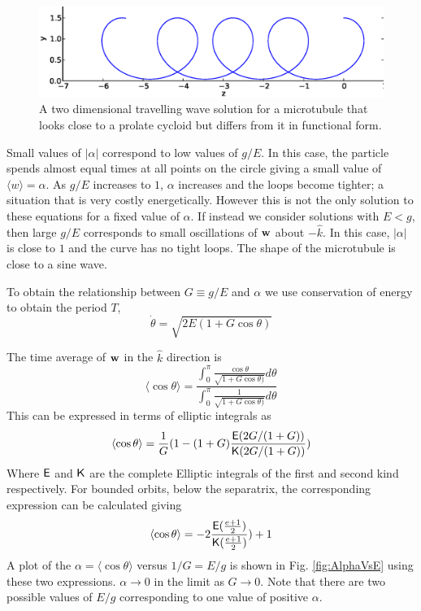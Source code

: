 \documentclass[11pt]{ucthesis}
\def\bw{{\bf w}}
\begin{document}
\begin{figure}[htp]
\begin{center}
\includegraphics[width=\hsize]{shape1.eps}
\caption{ 
A two dimensional travelling wave solution for a microtubule that looks close to a prolate cycloid but
differs from it in functional form.
}
\label{fig:prolate}
\end{center}
\end{figure}

Small values of $|\alpha|$ correspond to low values of $g/E$. In this case, the particle spends almost
equal times at all points on the circle giving a small value of $\langle w\rangle = \alpha$. As $g/E$
increases to $1$, $\alpha$ increases and the loops become tighter; a situation that is very costly energetically.
However this is not the only solution to these equations for a fixed value of $\alpha$. If instead we
consider solutions with $E < g$, then large $g/E$ corresponds to small oscillations of $\bw$ about $-{\hat k}$.
In this case, $|\alpha|$ is close to $1$ and the curve has no tight loops. The shape of the microtubule
is close to a sine wave.

To obtain the relationship between $G \equiv g/E$ and $\alpha$ we use conservation of energy
to obtain the period $T$,
\begin{equation}
\label{eq:pendulumenergy}
\dot{\theta} = \sqrt{2E(1+G\cos\theta)}
\end{equation}

The time average of $\bw$ in the $\hat k$ direction is
\begin{equation}
\label{eq:avependulumcostheta}
\langle \cos\theta\rangle = \frac{\int_0^\pi \frac{\cos\theta}{\sqrt{1+G\cos\theta)}} d\theta}{\int_0^\pi \frac{1}{\sqrt{1+G\cos\theta)}} d\theta}
\end{equation}
This can be expressed in terms of elliptic integrals as
\begin{equation}
\label{eq:avecosthetaElliptic}
\langle \cos\theta\rangle =  \frac{1}{G} (1- (1+G) \frac{{\sf E}(2G/(1+G))}{{\sf K}(2G/(1+G))})
\end{equation}
Where  $\sf E$ and $\sf K$ are the complete Elliptic integrals of the first and second kind respectively.
For bounded orbits, below the separatrix, the corresponding expression can be calculated giving
\begin{equation}
\label{eq:avecosthetaEllipticBounded}
\langle \cos\theta\rangle =  -2 \frac{{\sf E}(\frac{e+1}{2})}{{\sf K} (\frac{e+1}{2}) }) + 1
\end{equation}
A plot of the $\alpha = \langle \cos\theta\rangle$ versus $1/G = E/g$ is shown in Fig. \ref{fig:AlphaVsE}
using these two expressions.
$\alpha \rightarrow 0$ in the limit as $G \rightarrow 0$. Note that there are two possible values of
$E/g$ corresponding to one value of positive $\alpha$.
\end{document}
